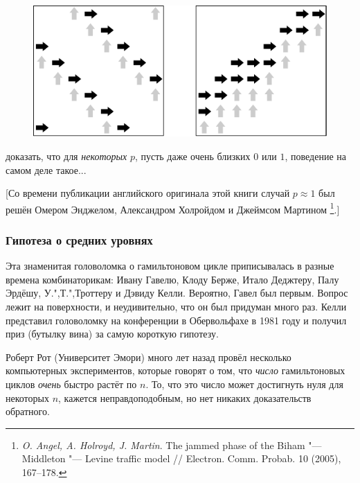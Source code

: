 \documentclass[twoside]{book}
\begin{document}
\begin{figure}[!ht]
\centering
\includegraphics{mp/wink-32}
\end{figure}

 доказать, что для \emph{некоторых} $p$, пусть даже очень близких  $0$ или $1$, поведение на самом деле такое...

[Со времени публикации английского оригинала этой книги случай $p\approx 1$ был решён Омером Энджелом,
Александром Холройдом и Джеймсом Мартином%
\footnote{\emph{O. Angel, A. Holroyd, J. Martin}. 
The jammed phase of the Biham "--- Middleton "--- Levine traffic model /\!/
{Electron. Comm. Probab.} 10 (2005), 167--178.}.]

\subsubsection*{Гипотеза о средних уровнях}

Эта знаменитая головоломка о гамильтоновом цикле приписывалась в разные времена комбинаторикам: Ивану Гавелю, Клоду Берже, Итало Деджтеру, Палу Эрдёшу, У.",Т.",Троттеру и Дэвиду Келли.
Вероятно, Гавел был первым.
Вопрос лежит на поверхности, и неудивительно, что он был придуман много раз.
Келли представил головоломку на конференции в Обервольфахе в 1981 году и получил приз (бутылку вина) за самую короткую гипотезу.


Роберт Рот (Университет Эмори) много лет назад провёл несколько компьютерных экспериментов, которые говорят о том, что \emph{число} гамильтоновых циклов \emph{очень} быстро растёт по $n$.
То, что это число может достигнуть нуля для некоторых $n$, кажется неправдоподобным, но нет никаких доказательств обратного.
\end{document}

